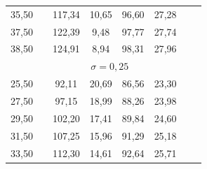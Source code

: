 \documentclass{article}
\begin{document}
\begin{appendices}
\begin{table}[h]
{\begin{tabular}{cXcccccr}
         35{,}50  &&      117{,}34   &      10{,}65  &       96{,}60 &        27{,}28\\
         37{,}50  &&      122{,}39   &       9{,}48  &       97{,}77 &        27{,}74\\
         38{,}50  &&      124{,}91   &       8{,}94  &       98{,}31 &        27{,}96\\
         \hline 
      &\multicolumn{5}{c}{$\sigma=0{,}25$} \\
      \hline 
         25{,}50  &&       92{,}11  &       20{,}69   &      86{,}56  &       23{,}30\\
         27{,}50  &&       97{,}15  &       18{,}99   &      88{,}26  &       23{,}98\\
         29{,}50  &&      102{,}20  &       17{,}41   &      89{,}84  &       24{,}60\\
         31{,}50  &&      107{,}25  &       15{,}96   &      91{,}29  &       25{,}18\\
         33{,}50  &&      112{,}30  &       14{,}61   &      92{,}64  &       25{,}71\\

\end{tabular}}
\end{table}
\end{appendices}
\end{document}
